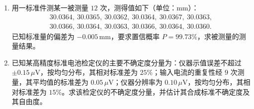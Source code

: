 \documentclass[UTF8,12pt,a4paper]{ctexart}
\begin{document}
\begin{enumerate}[label=\arabic*、]
\vspace{3cm}

\item 用一标准件测某一被测量 $12$ 次，测得值如下（单位：$\mathrm{mm}$）：
\begin{equation*}
\begin{gathered}
30.0364,\ 30.0365,\ 30.0362,\ 30.0364,\ 30.0367,\ 30.0363,\\
30.0366,\ 30.0364,\ 30.0363,\ 30.0366,\ 30.0364,\ 30.0360.
\end{gathered}
\end{equation*}
已知标准量的偏差为 $-0.005\,\mathrm{mm}$，要求置信概率 $P=99.73\%$，求被测量的测量结果。

\vspace{3cm}

\item 已知某高精度标准电池检定仪的主要不确定度分量为：仪器示值误差不超过 $\pm0.15\,\mu\mathrm{V}$，按均匀分布，其相对标准差为 $25\%$；输入电流的重复性经 $9$ 次测量，其平均值的标准差为 $0.05\,\mu\mathrm{V}$；仪器分辨率为 $0.10\,\mu\mathrm{V}$，按均匀分布，其相对标准差为 $15\%$。求该检定仪的不确定度分量，并估计其合成标准不确定度及其自由度。
\end{enumerate}
\end{document}
